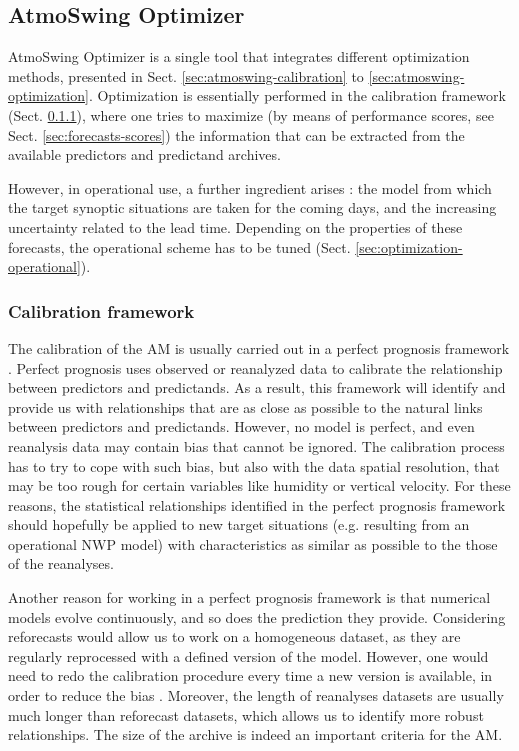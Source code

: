 \documentclass[review]{elsarticle}
\begin{document}
\subsection{AtmoSwing Optimizer}
\label{sec:optimizer}

AtmoSwing Optimizer is a single tool that integrates different optimization methods, presented in Sect. \ref{sec:atmoswing-calibration} to \ref{sec:atmoswing-optimization}. Optimization is essentially performed in the calibration framework (Sect. \ref{sec:calibration-framework}), where one tries to maximize (by means of performance scores, see Sect. \ref{sec:forecasts-scores}) the information that can be extracted from the available predictors and predictand archives.

However, in operational use, a further ingredient arises : the model from which the target synoptic situations are taken for the coming days, and the increasing uncertainty related to the lead time. Depending on the properties of these forecasts, the operational scheme has to be tuned (Sect. \ref{sec:optimization-operational}).


\subsubsection{Calibration framework}
\label{sec:calibration-framework}

The calibration of the AM is usually carried out in a perfect prognosis \citep{Klein1959} framework \citep{Bontron2004, BenDaoud2010}. Perfect prognosis uses observed or reanalyzed data to calibrate the relationship between predictors and predictands. As a result, this framework will identify and provide us with relationships that are as close as possible to the natural links between predictors and predictands. However, no model is perfect, and even reanalysis data may contain bias that cannot be ignored. The calibration process has to try to cope with such bias, but also with the data spatial resolution, that may be too rough for certain variables like humidity or vertical velocity. For these reasons, the statistical relationships identified in the perfect prognosis framework should hopefully be applied to new target situations (e.g. resulting from an operational NWP model) with characteristics as similar as possible to the those of the reanalyses.

Another reason for working in a perfect prognosis framework is that numerical models evolve continuously, and so does the prediction they provide. Considering reforecasts would allow us to work on a homogeneous dataset, as they are regularly reprocessed with a defined version of the model. However, one would need to redo the calibration procedure every time a new version is available, in order to reduce the bias \citep{Wilson2002}. Moreover, the length of reanalyses datasets are usually much longer than reforecast datasets, which allows us to identify more robust relationships. The size of the archive is indeed an important criteria for the AM.
\end{document}
